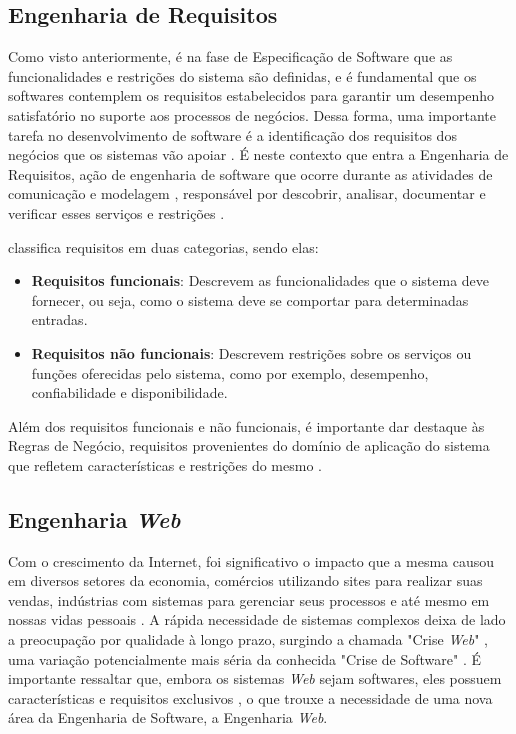 \subsection{Engenharia de Requisitos}
\label{subsec-fundteo-engsoft-engreq}

Como visto anteriormente, é na fase de Especificação de Software que as funcionalidades 
e restrições do sistema são definidas, e é fundamental que os softwares contemplem os
requisitos estabelecidos para garantir um desempenho satisfatório no suporte aos processos 
de negócios. Dessa forma, uma importante tarefa no desenvolvimento de software é a
identificação dos requisitos dos negócios que os sistemas vão apoiar \cite{falbo:2017}.
É neste contexto que entra a Engenharia de Requisitos, ação de engenharia de 
software que ocorre durante as atividades de comunicação e modelagem \cite{pressman:2011},
responsável por descobrir, analisar, documentar e verificar esses serviços e restrições \cite{sommerville:2011}. 

 classifica requisitos em duas categorias, sendo elas:

\begin{itemize}
    \item \textbf{Requisitos funcionais}: Descrevem as funcionalidades que o sistema deve 
        fornecer, ou seja, como o sistema deve se comportar para determinadas entradas.
    \item \textbf{Requisitos não funcionais}: Descrevem restrições sobre os serviços ou
        funções oferecidas pelo sistema, como por exemplo, desempenho, confiabilidade e 
        disponibilidade. 
\end{itemize}

Além dos requisitos funcionais e não funcionais, é importante dar destaque às Regras de
Negócio, requisitos provenientes do domínio de aplicação do sistema que refletem características
e restrições do mesmo \cite{sommerville:2011,falbo:2014}.


\subsection{Engenharia \textit{Web}}
\label{subsec-fundteo-engsoft-engweb}

Com o crescimento da Internet, foi significativo o impacto que a mesma causou em diversos
setores da economia, comércios utilizando sites para realizar suas vendas, indústrias com
sistemas para gerenciar seus processos e até mesmo em nossas vidas pessoais \cite{murugesan:2001}.
A rápida necessidade de sistemas complexos deixa de lado a preocupação por qualidade à longo prazo,
surgindo a chamada "Crise \textit{Web}" \cite{murugesan:2001}, uma variação potencialmente mais séria da 
conhecida "Crise de Software" \cite{gibbs:1994}. É importante ressaltar que, embora os sistemas \textit{Web}
sejam softwares, eles possuem características e requisitos exclusivos \cite{pressman:2011},
o que trouxe a necessidade de uma nova área da Engenharia de Software, a Engenharia \textit{Web}.

